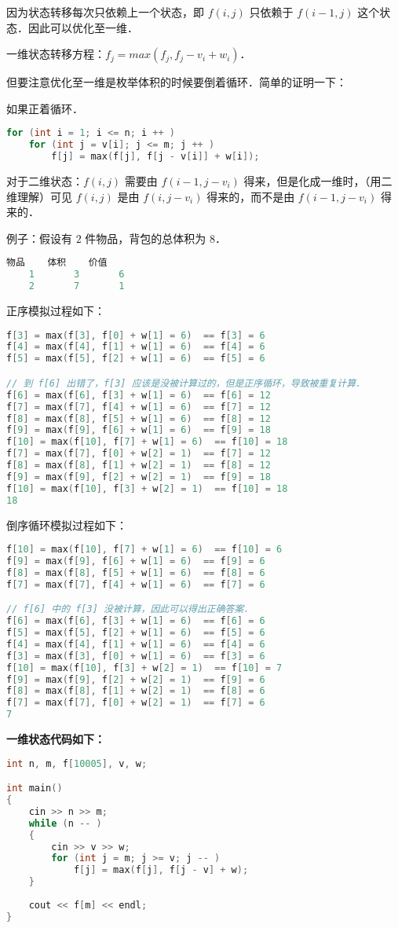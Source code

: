 因为状态转移每次只依赖上一个状态，即 $f(i, j)$ 只依赖于 $f(i - 1, j)$ 这个状态．因此可以优化至一维．

一维状态转移方程：$f_j = max(f_j, f_j - v_i + w_i)$．

但要注意优化至一维是枚举体积的时候要倒着循环．简单的证明一下：

如果正着循环．

\begin{lstlisting}[language=cpp]
for (int i = 1; i <= n; i ++ ) 
    for (int j = v[i]; j <= m; j ++ ) 
        f[j] = max(f[j], f[j - v[i]] + w[i]);
\end{lstlisting}

对于二维状态：$f(i, j)$ 需要由 $f(i - 1, j - v_i)$ 得来，但是化成一维时，（用二维理解）可见 $f(i, j)$ 是由 $f(i, j - v_i)$ 得来的，而不是由 $f(i - 1, j - v_i)$ 得来的．

例子：假设有 $2$ 件物品，背包的总体积为 $8$．

\begin{lstlisting}[language=cpp]
    物品    体积    价值
    1       3       6
    2       7       1
\end{lstlisting}

正序模拟过程如下：

\begin{lstlisting}[language=cpp]
f[3] = max(f[3], f[0] + w[1] = 6)  == f[3] = 6 
f[4] = max(f[4], f[1] + w[1] = 6)  == f[4] = 6 
f[5] = max(f[5], f[2] + w[1] = 6)  == f[5] = 6 

// 到 f[6] 出错了，f[3] 应该是没被计算过的，但是正序循环，导致被重复计算．
f[6] = max(f[6], f[3] + w[1] = 6)  == f[6] = 12
f[7] = max(f[7], f[4] + w[1] = 6)  == f[7] = 12 
f[8] = max(f[8], f[5] + w[1] = 6)  == f[8] = 12 
f[9] = max(f[9], f[6] + w[1] = 6)  == f[9] = 18 
f[10] = max(f[10], f[7] + w[1] = 6)  == f[10] = 18 
f[7] = max(f[7], f[0] + w[2] = 1)  == f[7] = 12 
f[8] = max(f[8], f[1] + w[2] = 1)  == f[8] = 12 
f[9] = max(f[9], f[2] + w[2] = 1)  == f[9] = 18 
f[10] = max(f[10], f[3] + w[2] = 1)  == f[10] = 18 
18
\end{lstlisting}

倒序循环模拟过程如下：

\begin{lstlisting}[language=cpp]
f[10] = max(f[10], f[7] + w[1] = 6)  == f[10] = 6 
f[9] = max(f[9], f[6] + w[1] = 6)  == f[9] = 6 
f[8] = max(f[8], f[5] + w[1] = 6)  == f[8] = 6 
f[7] = max(f[7], f[4] + w[1] = 6)  == f[7] = 6 

// f[6] 中的 f[3] 没被计算，因此可以得出正确答案．
f[6] = max(f[6], f[3] + w[1] = 6)  == f[6] = 6 
f[5] = max(f[5], f[2] + w[1] = 6)  == f[5] = 6 
f[4] = max(f[4], f[1] + w[1] = 6)  == f[4] = 6 
f[3] = max(f[3], f[0] + w[1] = 6)  == f[3] = 6 
f[10] = max(f[10], f[3] + w[2] = 1)  == f[10] = 7 
f[9] = max(f[9], f[2] + w[2] = 1)  == f[9] = 6 
f[8] = max(f[8], f[1] + w[2] = 1)  == f[8] = 6 
f[7] = max(f[7], f[0] + w[2] = 1)  == f[7] = 6 
7
\end{lstlisting}

\textbf{一维状态代码如下：}

\begin{lstlisting}[language=cpp]
int n, m, f[10005], v, w;

int main()
{
    cin >> n >> m;
    while (n -- )
    {
        cin >> v >> w;
        for (int j = m; j >= v; j -- )
            f[j] = max(f[j], f[j - v] + w);
    }
    
    cout << f[m] << endl;
}
\end{lstlisting}

